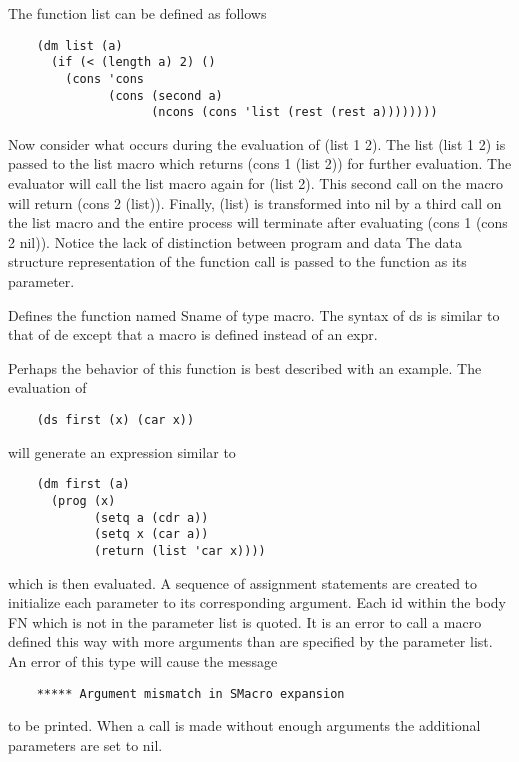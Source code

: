     The function list can be defined as follows
\begin{verbatim}
    (dm list (a)
      (if (< (length a) 2) ()
        (cons 'cons
              (cons (second a)
                    (ncons (cons 'list (rest (rest a))))))))
\end{verbatim}
    Now  consider  what  occurs during the evaluation of (list 1
    2).  The list (list 1 2) is passed to the list  macro  which
    returns  (cons  1  (list  2))  for  further evaluation.  The
    evaluator will call the list macro again for (list 2).  This
    second call on  the  macro  will  return  (cons  2  (list)).
    Finally,  (list)  is transformed into nil by a third call on
    the list macro and the entire process will  terminate  after
    evaluating  (cons  1  (cons  2  nil)).    Notice the lack of
    distinction between program and data    The  data  structure
    representation  of  the  function  call  is  passed  to  the
    function as its parameter.


{    Defines the function named Sname of type macro.  The  syntax
    of  ds  is  similar  to  that  of  de except that a macro is
    defined instead of an expr. 
}

 Perhaps the  behavior  of  this
    function  is best described with an example.  The evaluation
    of

\begin{verbatim}
    (ds first (x) (car x))
\end{verbatim}
    will generate an expression similar to

\begin{verbatim}
    (dm first (a)
      (prog (x)
            (setq a (cdr a))
            (setq x (car a))
            (return (list 'car x))))
\end{verbatim}
    which  is  then  evaluated.    A  sequence   of   assignment
    statements  are  created to initialize each parameter to its
    corresponding argument.  Each id within the body FN which is
    not in the parameter list is quoted.  It is an error to call
    a macro defined  this  way  with  more  arguments  than  are
    specified by the parameter list.  An error of this type will
    cause the message

\begin{verbatim}
    ***** Argument mismatch in SMacro expansion
\end{verbatim}
    to be printed.  When a call is made without enough arguments
    the additional parameters are set to nil.


